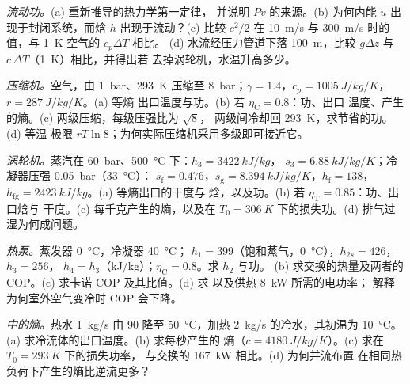 \begin{exercise}[$\star\star$]\label{exo:b2:open-systems:5}
\emph{流动功。}(a) 重新推导的热力学第一定律，
并说明 $Pv$ 的来源。(b) 为何内能 $u$
出现于封闭系统，而焓 $h$ 出现于流动？(c) 比较 $c^2/2$ 在
\qty{10}{m/s} 与 \qty{300}{m/s} 时的值，与 \qty{1}{K} 空气的 $c_p\Delta T$ 相比。
(d) 水流经压力管道下落 \qty{100}{m}，比较 $g\Delta z$ 与
$c\,\Delta T$（\qty{1}{K}）相比，并得出若
去掉涡轮机，水温升高多少。
\end{exercise}

\begin{exercise}[$\star\star$]\label{exo:b2:open-systems:6}
\emph{压缩机。}空气，由 \qty{1}{bar}、\qty{293}{K} 压缩至 \qty{8}{bar}；$\gamma =
1.4$，$c_p = \qty{1005}{J/kg/K}$，$r = \qty{287}{J/kg/K}$。(a) 等熵
出口温度与功。(b) 若 $\eta_{\text{C}} = 0.8$：功、出口
温度、产生的熵。(c) 两级压缩，每级压强比为 $\sqrt8$，
两级间冷却回 \qty{293}{K}，求节省的功。(d) 等温
极限 $rT\ln 8$；为何实际压缩机采用多级即可接近它。
\end{exercise}

\begin{exercise}[$\star\star$]\label{exo:b2:open-systems:7}
\emph{涡轮机。}蒸汽在 \qty{60}{bar}、\qty{500}{\celsius} 下：$h_3 = \qty{3422}{kJ/kg}$，
$s_3 = \qty{6.88}{kJ/kg/K}$；冷凝器压强 \qty{0.05}{bar}（\qty{33}{\celsius}）：
$s_{\text{f}} = 0.476$，$s_{\text{g}} = \qty{8.394}{kJ/kg/K}$，$h_{\text{f}} = 138$，
$h_{\text{fg}} = \qty{2423}{kJ/kg}$。(a) 等熵出口的干度与
焓，以及功。(b) 若 $\eta_{\text{T}} = 0.85$：功、出口焓与
干度。(c) 每千克产生的熵，以及在 $T_0 =
\qty{306}{K}$ 下的损失功。(d) 排气过湿为何成问题。
\end{exercise}

\begin{exercise}[$\star\star$]\label{exo:b2:open-systems:8}
\emph{热泵。}蒸发器 \qty{0}{\celsius}，冷凝器 \qty{40}{\celsius}；
$h_1 = 399$（饱和蒸气，\qty{0}{\celsius}），$h_{2s} = 426$，$h_3 = 256$，
$h_4 = h_3$（\unit{kJ/kg}）；$\eta_{\text{C}} = 0.8$。求 $h_2$ 与功。
(b) 求交换的热量及两者的 COP。(c) 求卡诺 COP 及其比值。(d) 求
以及供热 \qty{8}{kW} 所需的电功率；
解释为何室外空气变冷时 COP 会下降。
\end{exercise}

\begin{exercise}[$\star\star$]\label{exo:b2:open-systems:9}
\emph{中的熵。}热水 \qty{1}{kg/s} 由 \qty{90}{} 降至
\qty{50}{\celsius}，加热 \qty{2}{kg/s} 的冷水，其初温为 \qty{10}{\celsius}。
(a) 求冷流体的出口温度。(b) 求每秒产生的
熵（$c = \qty{4180}{J/kg/K}$）。(c) 求在 $T_0 = \qty{293}{K}$ 下的损失功率，
与交换的 \qty{167}{kW} 相比。(d) 为何并流布置
在相同热负荷下产生的熵比逆流更多？
\end{exercise}

